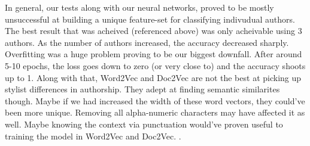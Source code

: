 \documentclass[conference]{IEEEtran}
\begin{document}
    In general, our tests along with our neural networks, proved to be mostly unsuccessful at building a unique feature-set for classifying indivudual authors. The best result that was acheived (referenced above) was only acheivable using 3 authors. As the number of authors increased, the accuracy decreased sharply. Overfitting was a huge problem proving to be our biggest downfall. After around 5-10 epochs, the loss goes down to zero (or very close to) and the accuracy shoots up to 1. Along with that, Word2Vec and Doc2Vec are not the best at picking up stylist differences in authorship. They adept at finding semantic similarites though. Maybe if we had increased the width of these word vectors, they could've been more unique. Removing all alpha-numeric characters may have affected it as well. Maybe knowing the context via punctuation would've proven useful to training the model in Word2Vec and Doc2Vec. \cite{b5}.


\end{document}
